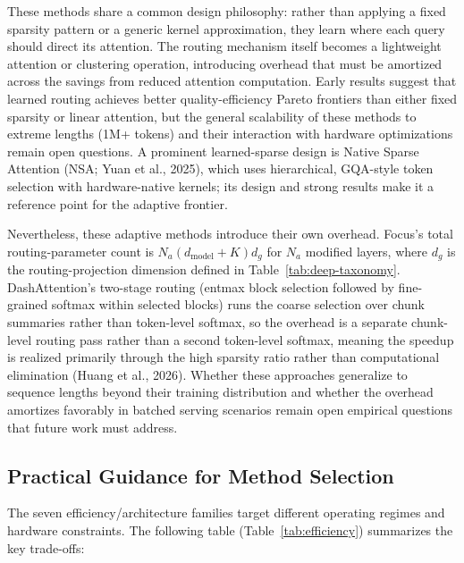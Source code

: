 \documentclass[10pt,twocolumn]{article}
\begin{document}
These methods share a common design philosophy: rather than applying a fixed sparsity pattern or a generic kernel approximation, they learn where each query should direct its attention. The routing mechanism itself becomes a lightweight attention or clustering operation, introducing overhead that must be amortized across the savings from reduced attention computation. Early results suggest that learned routing achieves better quality-efficiency Pareto frontiers than either fixed sparsity or linear attention, but the general scalability of these methods to extreme lengths (1M+ tokens) and their interaction with hardware optimizations remain open questions. A prominent learned-sparse design is Native Sparse Attention (NSA; Yuan et al., 2025), which uses hierarchical, GQA-style token selection with hardware-native kernels; its design and strong results make it a reference point for the adaptive frontier.

Nevertheless, these adaptive methods introduce their own overhead. Focus's total routing-parameter count is $N_a(d_{\mathrm{model}}+K)d_g$ for $N_a$ modified layers, where $d_g$ is the routing-projection dimension defined in Table~\ref{tab:deep-taxonomy}. DashAttention's two-stage routing (entmax block selection followed by fine-grained softmax within selected blocks) runs the coarse selection over chunk summaries rather than token-level softmax, so the overhead is a separate chunk-level routing pass rather than a second token-level softmax, meaning the speedup is realized primarily through the high sparsity ratio rather than computational elimination (Huang et al., 2026). Whether these approaches generalize to sequence lengths beyond their training distribution and whether the overhead amortizes favorably in batched serving scenarios remain open empirical questions that future work must address.

\subsection{Practical Guidance for Method Selection}\label{practical-guidance-for-method-selection}

The seven efficiency/architecture families target different operating regimes and hardware constraints. The following table (Table~\ref{tab:efficiency}) summarizes the key trade-offs:
\end{document}
